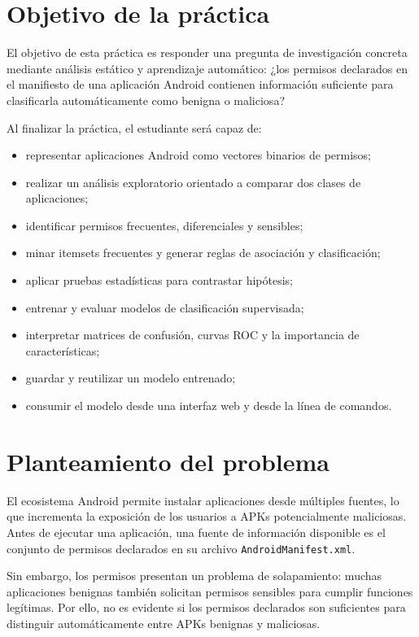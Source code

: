 \documentclass[
  coursetitle={Cómputo Nube y Tecnologías Emergentes},
  coursehours={96},
  coursedate={Verano 2026},
  doctype={Tutorial},
  otherlangs={english,french},
  authorname={Lázaro},
  authorsurname={Bustio-Martínez},
  authortitle={PhD},
  role={Profesor Investigador},
  email={lbustio@inaoe.mx},
  phone={5559504000},
  ext={7459},
  institution={Instituto Nacional de Astrofísica, Óptica y Electrónica (INAOE)},
  department={Maestría en Ciencias en Tecnologías de Seguridad},
  address={Luis Enrique Erro 1, Sta. Ma. Tonantzintla, San Andrés Cholula, CP 72840, Puebla, México},
  margin={0.5in}
]{../../lbustio_lecture_notes}
\begin{document}
\IberoCover

\section{Objetivo de la práctica}

El objetivo de esta práctica es responder una pregunta de investigación concreta mediante análisis estático y aprendizaje automático: ¿los permisos declarados en el manifiesto de una aplicación Android contienen información suficiente para clasificarla automáticamente como benigna o maliciosa?

Al finalizar la práctica, el estudiante será capaz de:

\begin{itemize}
    \item representar aplicaciones Android como vectores binarios de permisos;
    \item realizar un análisis exploratorio orientado a comparar dos clases de aplicaciones;
    \item identificar permisos frecuentes, diferenciales y sensibles;
    \item minar itemsets frecuentes y generar reglas de asociación y clasificación;
    \item aplicar pruebas estadísticas para contrastar hipótesis;
    \item entrenar y evaluar modelos de clasificación supervisada;
    \item interpretar matrices de confusión, curvas ROC y la importancia de características;
    \item guardar y reutilizar un modelo entrenado;
    \item consumir el modelo desde una interfaz web y desde la línea de comandos.
\end{itemize}

\section{Planteamiento del problema}

El ecosistema Android permite instalar aplicaciones desde múltiples fuentes, lo que incrementa la exposición de los usuarios a APKs potencialmente maliciosas. Antes de ejecutar una aplicación, una fuente de información disponible es el conjunto de permisos declarados en su archivo \texttt{AndroidManifest.xml}.

Sin embargo, los permisos presentan un problema de solapamiento: muchas aplicaciones benignas también solicitan permisos sensibles para cumplir funciones legítimas. Por ello, no es evidente si los permisos declarados son suficientes para distinguir automáticamente entre APKs benignas y maliciosas.
\end{document}
